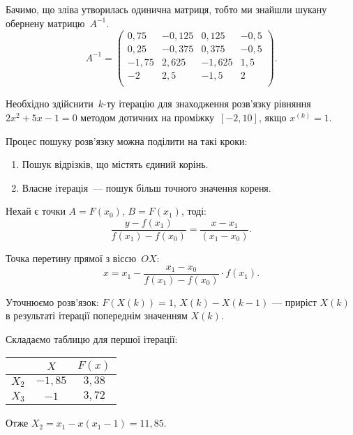 \documentclass[a4paper,oneside,DIV=12,12pt]{scrartcl}
\begin{document}
\begin{solution}
			Бачимо, що зліва утворилась одинична матриця, тобто ми знайшли шукану обернену матрицю~$A^{-1}$.
			\[
				A^{-1} = 
				\left(
					\begin{array}{rrrr}
						0{,}75  & -0{,}125 & 0{,}125  & -0{,}5 \\
						0{,}25  & -0{,}375 & 0{,}375  & -0{,}5 \\
						-1{,}75 & 2{,}625  & -1{,}625 & 1{,}5 \\
						-2      & 2{,}5    & -1{,}5   & 2 \\
					\end{array}
				\right).
			\]
		
	\end{solution}
	
	\begin{exercise}
		Необхідно здійснити~$k$-ту ітерацію для знаходження розв'язку рівняння $2x^2 + 5x - 1 = 0$ методом дотичних на проміжку~$\left[ -2, 10\right]$, якщо $x^{(k)} = 1$.
	\end{exercise}
	
	\begin{solution}
		Процес пошуку розв'язку можна поділити на такі кроки:
		\begin{enumerate}
			\item Пошук відрізків, що містять єдиний корінь.
			\item Власне ітерація~— пошук більш точного значення кореня.
		\end{enumerate}
		
		Нехай є точки $A = F(x_0)$, $B = F(x_1)$, тоді:
		\[
			\frac{y - f(x_1)}{f(x_1) - f(x_0)} = \frac{x - x_1}{(x_1 - x_0)}.
		\]
		
		Точка перетину прямої з віссю~$OX$:
		\[
			x = x_1 - \frac{x_1 - x_0}{f(x_1) - f(x_0)} \cdot f(x_1).
		\]
		
		Уточнюємо розв'язок: $F(X(k)) = 1$, $X(k) - X(k - 1)$ — приріст $X(k)$ в результаті ітерації попереднім значенням $X(k)$.
		
		Складаємо таблицю для першої ітерації:
		\begin{longtable}[c]{lcc}
			\toprule
				& $X$ & $F(x)$\\
			\midrule
			\endhead
			\bottomrule
			\endfoot
			
			$X_2$ & $-1{,}85$ & $3{,}38$ \\
			$X_3$ & $-1$ & $3{,}72$ \\
		\end{longtable}
		
		Отже $X_2 = x_1 - x \left( x_1 - 1\right) = 11{,}85$.
	\end{solution}
	
\end{document}
